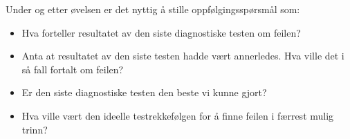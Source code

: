Under og etter øvelsen er det nyttig å stille oppfølgingsspørsmål som:

\begin{itemize}
\item{} Hva forteller resultatet av den siste diagnostiske testen om feilen?
\item{} Anta at resultatet av den siste testen hadde vært annerledes. Hva ville det i så fall fortalt om feilen?
\item{} Er den siste diagnostiske testen den beste vi kunne gjort?
\item{} Hva ville vært den ideelle testrekkefølgen for å finne feilen i færrest mulig trinn?
\end{itemize}


